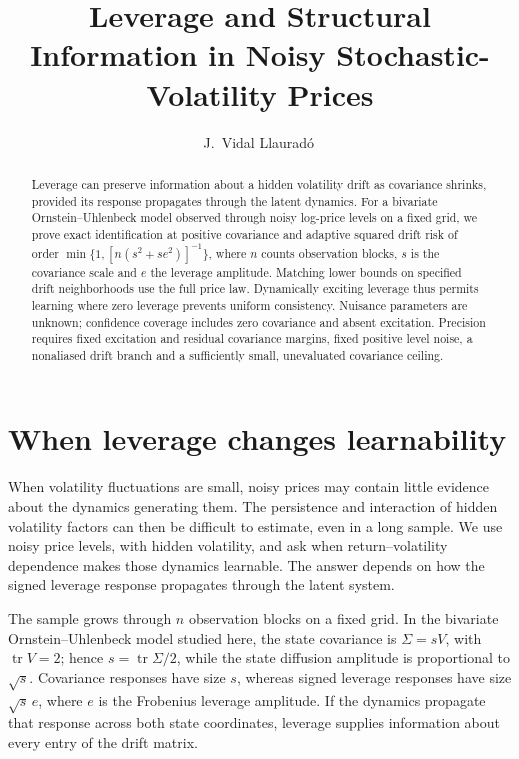 \documentclass[11pt,a4paper]{amsart}
\title[Leverage and structural information]{Leverage and Structural Information in Noisy Stochastic-Volatility Prices}
\author[J.~Vidal Llaurad\'o]{J.~Vidal Llaurad\'o\,\orcidlink{0009-0002-1918-5458}}
\date{}
\theoremstyle{plain}
\theoremstyle{definition}
\theoremstyle{remark}
\DeclareMathOperator{\tr}{tr}
\begin{document}
\begin{abstract}
Leverage can preserve information about a hidden volatility drift as
covariance shrinks, provided its response propagates through the latent
dynamics. For a bivariate Ornstein--Uhlenbeck model observed through noisy
log-price levels on a fixed grid, we prove exact identification at positive
covariance and adaptive squared drift risk of order
$\min\{1,[n(s^2+se^2)]^{-1}\}$, where $n$ counts observation blocks,
$s$ is the covariance scale and $e$ the leverage amplitude. Matching
lower bounds on specified drift neighborhoods use the full price law.
Dynamically exciting leverage thus permits learning where zero leverage
prevents uniform consistency. Nuisance parameters are unknown; confidence
coverage includes zero covariance and absent excitation. Precision requires
fixed excitation and residual covariance margins, fixed positive level
noise, a nonaliased drift branch and a sufficiently small, unevaluated
covariance ceiling.
\end{abstract}
\maketitle

\section{When leverage changes learnability}\label{sec:intro}

When volatility fluctuations are small, noisy prices may contain little
evidence about the dynamics generating them. The persistence and interaction
of hidden volatility factors can then be difficult to estimate, even in a
long sample. We use noisy
price levels, with hidden volatility, and ask when return--volatility
dependence makes those dynamics learnable. The answer depends on how the
signed leverage response propagates through the latent system.

The sample grows through $n$ observation blocks on a fixed grid. In the
bivariate Ornstein--Uhlenbeck model studied here, the state covariance is
$\Sigma=sV$, with $\tr V=2$; hence $s=\tr\Sigma/2$, while the state
diffusion amplitude is proportional to $\sqrt{s}$. Covariance responses
have size $s$, whereas signed leverage responses have size $\sqrt{s}\,e$,
where $e$ is the Frobenius leverage amplitude. If the dynamics propagate
that response across both state coordinates, leverage supplies information
about every entry of the drift matrix.
\end{document}
